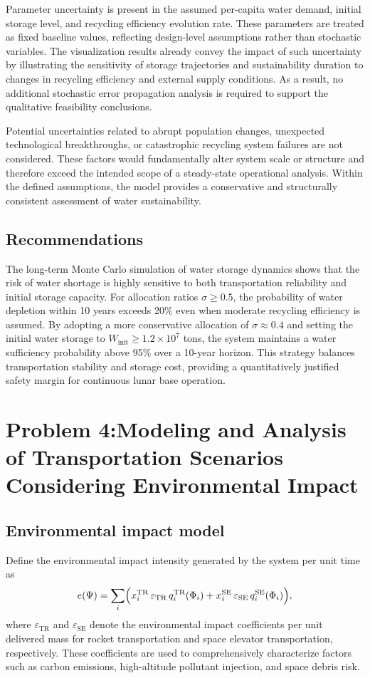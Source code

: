 \documentclass[12pt]{article}
\begin{document}
Parameter uncertainty is present in the assumed per-capita water demand, initial storage level, and recycling efficiency evolution rate. These parameters are treated as fixed baseline values, reflecting design-level assumptions rather than stochastic variables. The visualization results already convey the impact of such uncertainty by illustrating the sensitivity of storage trajectories and sustainability duration to changes in recycling efficiency and external supply conditions. As a result, no additional stochastic error propagation analysis is required to support the qualitative feasibility conclusions.

Potential uncertainties related to abrupt population changes, unexpected technological breakthroughs, or catastrophic recycling system failures are not considered. These factors would fundamentally alter system scale or structure and therefore exceed the intended scope of a steady-state operational analysis. Within the defined assumptions, the model provides a conservative and structurally consistent assessment of water sustainability.

\subsection{Recommendations}

The long-term Monte Carlo simulation of water storage dynamics shows that the risk of water shortage is highly sensitive to both transportation reliability and initial storage capacity. For allocation ratios $\sigma \geq 0.5$, the probability of water depletion within 10 years exceeds 20\% even when moderate recycling efficiency is assumed. By adopting a more conservative allocation of $\sigma \approx 0.4$ and setting the initial water storage to $W_{\mathrm{init}} \geq 1.2 \times 10^{7}$ tons, the system maintains a water sufficiency probability above 95\% over a 10-year horizon. This strategy balances transportation stability and storage cost, providing a quantitatively justified safety margin for continuous lunar base operation.

\section{Problem 4:Modeling and Analysis of Transportation Scenarios Considering Environmental Impact}

\subsection{Environmental impact model}
Define the environmental impact intensity generated by the system per unit time as
\[
e(\Psi)
= \sum_i \Bigl(
x_i^{\mathrm{TR}}\, \varepsilon_{\mathrm{TR}}\, q_i^{\mathrm{TR}}(\Phi_i)
+ x_i^{\mathrm{SE}}\, \varepsilon_{\mathrm{SE}}\, q_i^{\mathrm{SE}}(\Phi_i)
\Bigr),
\]
where $\varepsilon_{\mathrm{TR}}$ and $\varepsilon_{\mathrm{SE}}$ denote the environmental impact coefficients per unit delivered mass for rocket transportation and space elevator transportation, respectively. These coefficients are used to comprehensively characterize factors such as carbon emissions, high-altitude pollutant injection, and space debris risk.
\end{document}
